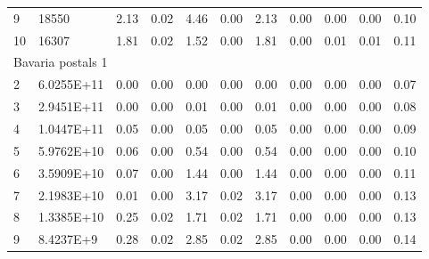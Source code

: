 {\begin{longtable}{@{}llccccccccc@{}}
\multicolumn{1}{l|}{9}  & \multicolumn{1}{l|}{18550}      & 2.13 & \multicolumn{1}{c|}{0.02} & 4.46 & \multicolumn{1}{c|}{0.00} & 2.13 & \multicolumn{1}{c|}{0.00} & 0.00           & 0.00           & 0.10 \\
\multicolumn{1}{l|}{10} & \multicolumn{1}{l|}{16307}      & 1.81 & \multicolumn{1}{c|}{0.02} & 1.52 & \multicolumn{1}{c|}{0.00} & 1.81 & \multicolumn{1}{c|}{0.00} & 0.01           & 0.01           & 0.11 \\ \hline
\multicolumn{11}{l}{Bavaria postals 1}                                                                                                                                                                      \\ \hline
\multicolumn{1}{l|}{2}  & \multicolumn{1}{l|}{6.0255E+11} & 0.00 & \multicolumn{1}{c|}{0.00} & 0.00 & \multicolumn{1}{c|}{0.00} & 0.00 & \multicolumn{1}{c|}{0.00} & 0.00           & 0.00           & 0.07 \\
\multicolumn{1}{l|}{3}  & \multicolumn{1}{l|}{2.9451E+11} & 0.00 & \multicolumn{1}{c|}{0.00} & 0.01 & \multicolumn{1}{c|}{0.00} & 0.01 & \multicolumn{1}{c|}{0.00} & 0.00           & 0.00           & 0.08 \\
\multicolumn{1}{l|}{4}  & \multicolumn{1}{l|}{1.0447E+11} & 0.05 & \multicolumn{1}{c|}{0.00} & 0.05 & \multicolumn{1}{c|}{0.00} & 0.05 & \multicolumn{1}{c|}{0.00} & 0.00           & 0.00           & 0.09 \\
\multicolumn{1}{l|}{5}  & \multicolumn{1}{l|}{5.9762E+10} & 0.06 & \multicolumn{1}{c|}{0.00} & 0.54 & \multicolumn{1}{c|}{0.00} & 0.54 & \multicolumn{1}{c|}{0.00} & 0.00           & 0.00           & 0.10 \\
\multicolumn{1}{l|}{6}  & \multicolumn{1}{l|}{3.5909E+10} & 0.07 & \multicolumn{1}{c|}{0.00} & 1.44 & \multicolumn{1}{c|}{0.00} & 1.44 & \multicolumn{1}{c|}{0.00} & 0.00           & 0.00           & 0.11 \\
\multicolumn{1}{l|}{7}  & \multicolumn{1}{l|}{2.1983E+10} & 0.01 & \multicolumn{1}{c|}{0.00} & 3.17 & \multicolumn{1}{c|}{0.02} & 3.17 & \multicolumn{1}{c|}{0.00} & 0.00           & 0.00           & 0.13 \\
\multicolumn{1}{l|}{8}  & \multicolumn{1}{l|}{1.3385E+10} & 0.25 & \multicolumn{1}{c|}{0.02} & 1.71 & \multicolumn{1}{c|}{0.02} & 1.71 & \multicolumn{1}{c|}{0.00} & 0.00           & 0.00           & 0.13 \\
\multicolumn{1}{l|}{9}  & \multicolumn{1}{l|}{8.4237E+9}  & 0.28 & \multicolumn{1}{c|}{0.02} & 2.85 & \multicolumn{1}{c|}{0.02} & 2.85 & \multicolumn{1}{c|}{0.00} & 0.00           & 0.00           & 0.14 \\

\end{longtable}}
